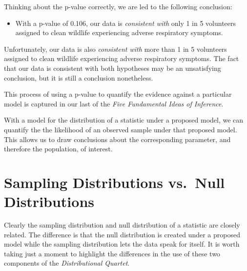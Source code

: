 \documentclass[
  letterpaper,
  DIV=11,
  numbers=noendperiod]{scrreprt}
\providecommand{\tightlist}{%
  \setlength{\itemsep}{0pt}\setlength{\parskip}{0pt}}\usepackage{longtable,booktabs,array}
\theoremstyle{plain}
\theoremstyle{definition}
\theoremstyle{definition}
\theoremstyle{remark}
\begin{document}
Thinking about the p-value correctly, we are led to the following
conclusion:

\begin{itemize}
\tightlist
\item
  With a p-value of 0.106, our data is \emph{consistent with} only 1 in
  5 volunteers assigned to clean wildlife experiencing adverse
  respiratory symptoms.
\end{itemize}

Unfortunately, our data is also \emph{consistent with} more than 1 in 5
volunteers assigned to clean wildlife experiencing adverse respiratory
symptoms. The fact that our data is consistent with both hypotheses may
be an unsatisfying conclusion, but it is still a conclusion nonetheless.

This process of using a p-value to quantify the evidence against a
particular model is captured in our last of the \emph{Five Fundamental
Ideas of Inference}.

\begin{tcolorbox}[enhanced jigsaw, breakable, titlerule=0mm, colframe=quarto-callout-important-color-frame, bottomtitle=1mm, opacityback=0, rightrule=.15mm, toptitle=1mm, arc=.35mm, bottomrule=.15mm, left=2mm, title=\textcolor{quarto-callout-important-color}{\faExclamation}\hspace{0.5em}{Fundamental Idea V}, leftrule=.75mm, coltitle=black, toprule=.15mm, colbacktitle=quarto-callout-important-color!10!white, colback=white, opacitybacktitle=0.6]

With a model for the distribution of a statistic under a proposed model,
we can quantify the the likelihood of an observed sample under that
proposed model. This allows us to draw conclusions about the
corresponding parameter, and therefore the population, of interest.

\end{tcolorbox}

\section{Sampling Distributions vs.~Null
Distributions}\label{sampling-distributions-vs.-null-distributions}

Clearly the sampling distribution and null distribution of a statistic
are closely related. The difference is that the null distribution is
created under a proposed model while the sampling distribution lets the
data speak for itself. It is worth taking just a moment to highlight the
differences in the use of these two components of the
\emph{Distributional Quartet}.
\end{document}
